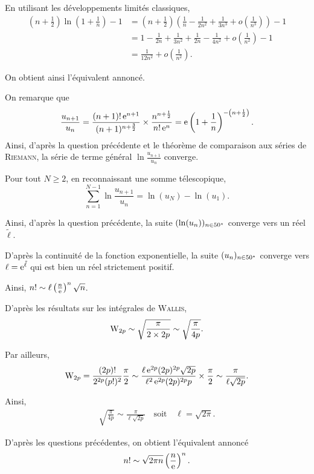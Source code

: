 \begin{solution}
\begin{reponses}
\item En utilisant les développements limités classiques,
\begin{align*}
\left(n + \frac{1}{2}\right) \ln\mathopen{}\left(1 + \frac{1}{n}\right) - 1
&= \left(n + \frac{1}{2}\right) \left(\frac{1}{n} - \frac{1}{2 n^2} + \frac{1}{3 n^3} + o\mathopen{}\left(\frac{1}{n^3}\right)\right) - 1\\
&= 1 - \frac{1}{2 n} + \frac{1}{3 n^2} + \frac{1}{2 n} - \frac{1}{4 n^2} + o\mathopen{}\left(\frac{1}{n^2}\right) - 1\\
&= \frac{1}{12 n^2} + o\mathopen{}\left(\frac{1}{n^2}\right).
\end{align*}

On obtient ainsi l'équivalent annoncé.

\item On remarque que
\[
\frac{u_{n+1}}{u_n}
= \frac{(n + 1)!\, \mathrm{e}^{n+1}}{(n+1)^{n+\frac{3}{2}}} \times \frac{n^{n+\frac{1}{2}}}{n!\, \mathrm{e}^n}
= \mathrm{e} \left(1 + \frac{1}{n}\right)^{-\mathopen{}\left(n + \frac{1}{2}\right)}.
\]
Ainsi, d'après la question précédente et le théorème de comparaison aux séries de \textsc{Riemann}, la série de terme général $\ln\frac{u_{n+1}}{u_n}$ converge.

\item Pour tout $N \geqslant 2$, en reconnaissant une somme télescopique,
\[
\sum_{n=1}^{N-1} \ln\frac{u_{n+1}}{u_n} = \ln(u_N) - \ln(u_1).
\]

Ainsi, d'après la question précédente, la suite $(\ln(u_n))_{n\in50^\star}$ converge vers un réel $\tilde{\ell}$.

D'après la continuité de la fonction exponentielle, la suite $(u_n)_{n\in50^\star}$ converge vers $\ell = \mathrm{e}^{\tilde{\ell}}$ qui est bien un réel strictement positif.

Ainsi, $n! \sim \ell \left(\frac{n}{\mathrm{e}}\right)^n \sqrt{n}$.

\item D'après les résultats sur les intégrales de \textsc{Wallis},
\[
\mathrm{W}_{2p}
\sim \sqrt{\frac{\pi}{2\times 2p}}
\sim \sqrt{\frac{\pi}{4 p}}.
\]

Par ailleurs,
\begin{align*}
\mathrm{W}_{2p}
= \frac{(2p)!}{2^{2p} (p!)^2} \frac{\pi}{2}
\sim \frac{\ell\, \mathrm{e}^{2p} (2p)^{2p} \sqrt{2p}}{\ell^2\, \mathrm{e}^{2p} (2p)^{2p} p} \times \frac{\pi}{2}
\sim \frac{\pi}{\ell \sqrt{2 p}}.
\end{align*}

Ainsi,
\begin{align*}
\sqrt{\frac{\pi}{4 p}} \sim \frac{\pi}{\ell \sqrt{2p}}
\quad \text{soit} \quad 
\ell = \sqrt{2 \pi}.
\end{align*}

\item D'après les questions précédentes, on obtient l'équivalent annoncé
\[
n! \sim \sqrt{2 \pi n} \left(\frac{n}{\mathrm{e}}\right)^n.
\]
\end{reponses}
\end{solution}

